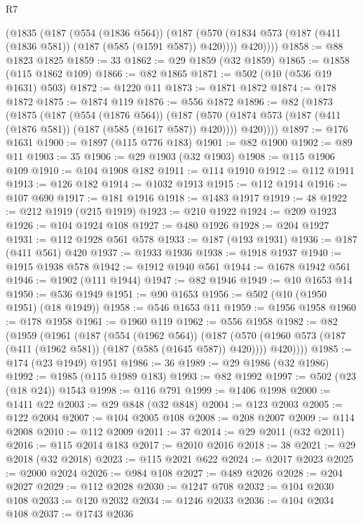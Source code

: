 \begin{lexlean}{R7}
\begin{coremodule}
      (@1835
        (@187
          (@554 (@1836 @564))
          (@187
            (@570 (@1834 @573 (@187 (@411 (@1836 @581)) (@187 (@585 (@1591 @587)) @420))))
            @420))))
@1858 := @88 @1823 @1825
@1859 := 33
@1862 := @29 @1859 (@32 @1859)
@1865 := @1858 (@115 @1862 @109)
@1866 := @82 @1865
@1871 := @502 (@10 (@536 @19 @1631) @503)
@1872 := @1220 @11
@1873 := @1871 @1872
@1874 := @178 @1872
@1875 := @1874 @119
@1876 := @556 @1872
@1896 := @82
    (@1873
      (@1875
        (@187
          (@554 (@1876 @564))
          (@187
            (@570 (@1874 @573 (@187 (@411 (@1876 @581)) (@187 (@585 (@1617 @587)) @420))))
            @420))))
@1897 := @176 @1631
@1900 := @1897 (@115 @776 @183)
@1901 := @82 @1900
@1902 := @89 @11
@1903 := 35
@1906 := @29 @1903 (@32 @1903)
@1908 := @115 @1906 @109
@1910 := @104 @1908 @182
@1911 := @114 @1910
@1912 := @112 @1911
@1913 := @126 @182
@1914 := @1032 @1913
@1915 := @112 @1914
@1916 := @107 @690
@1917 := @181 @1916
@1918 := @1483 @1917
@1919 := 48
@1922 := @212 @1919 (@215 @1919)
@1923 := @210 @1922
@1924 := @209 @1923
@1926 := @104 @1924 @108
@1927 := @480 @1926
@1928 := @204 @1927
@1931 := @112 @1928 @561 @578
@1933 := @187 (@193 @1931)
@1936 := @187 (@411 @561) @420
@1937 := @1933 @1936
@1938 := @1918 @1937
@1940 := @1915 @1938 @578
@1942 := @1912 @1940 @561
@1944 := @1678 @1942 @561
@1946 := @1902 (@111 @1944)
@1947 := @82 @1946
@1949 := @10 @1653 @14
@1950 := @536 @1949
@1951 := @90 @1653
@1956 := @502 (@10 (@1950 @1951) (@18 @1949))
@1958 := @546 @1653 @11
@1959 := @1956 @1958
@1960 := @178 @1958
@1961 := @1960 @119
@1962 := @556 @1958
@1982 := @82
    (@1959
      (@1961
        (@187
          (@554 (@1962 @564))
          (@187
            (@570 (@1960 @573 (@187 (@411 (@1962 @581)) (@187 (@585 (@1645 @587)) @420))))
            @420))))
@1985 := @174 (@23 @1949) @1951
@1986 := 36
@1989 := @29 @1986 (@32 @1986)
@1992 := @1985 (@115 @1989 @183)
@1993 := @82 @1992
@1997 := @502 (@23 (@18 @24)) @1543
@1998 := @116 @791
@1999 := @1406 @1998
@2000 := @1411 @22
@2003 := @29 @848 (@32 @848)
@2004 := @123 @2003
@2005 := @122 @2004
@2007 := @104 @2005 @108
@2008 := @208 @2007
@2009 := @114 @2008
@2010 := @112 @2009
@2011 := 37
@2014 := @29 @2011 (@32 @2011)
@2016 := @115 @2014 @183
@2017 := @2010 @2016
@2018 := 38
@2021 := @29 @2018 (@32 @2018)
@2023 := @115 @2021 @622
@2024 := @2017 @2023
@2025 := @2000 @2024
@2026 := @984 @108
@2027 := @489 @2026
@2028 := @204 @2027
@2029 := @112 @2028
@2030 := @1247 @708
@2032 := @104 @2030 @108
@2033 := @120 @2032
@2034 := @1246 @2033
@2036 := @104 @2034 @108
@2037 := @1743 @2036

\end{coremodule}
\end{lexlean}
